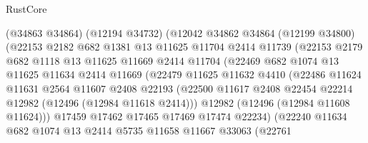 \begin{lexlean}{RustCore}
\begin{coremodule}
                      (@34863 @34864)
                      (@12194 @34732)
                      (@12042
                        @34862
                        @34864
                        (@12199 @34800)
                        (@22153
                          @2182
                          @682
                          @1381
                          @13
                          @11625
                          @11704
                          @2414
                          @11739
                          (@22153
                            @2179
                            @682
                            @1118
                            @13
                            @11625
                            @11669
                            @2414
                            @11704
                            (@22469
                              @682
                              @1074
                              @13
                              @11625
                              @11634
                              @2414
                              @11669
                              (@22479
                                @11625
                                @11632
                                @4410
                                (@22486
                                  @11624
                                  @11631
                                  @2564
                                  @11607
                                  @2408
                                  @22193
                                  (@22500
                                    @11617
                                    @2408
                                    @22454
                                    @22214
                                    @12982
                                    (@12496 (@12984 @11618 @2414)))
                                  @12982
                                  (@12496 (@12984 @11608 @11624)))
                                @17459
                                @17462
                                @17465
                                @17469
                                @17474
                                @22234)
                              (@22240
                                @11634
                                @682
                                @1074
                                @13
                                @2414
                                @5735
                                @11658
                                @11667
                                @33063
                                (@22761

\end{coremodule}
\end{lexlean}
